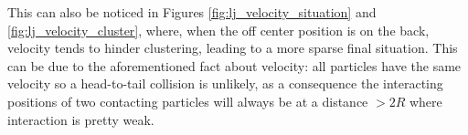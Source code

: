 \documentclass[../../master_thesis_np.tex]{subfiles}
\begin{document}
		This can also be noticed in Figures \ref{fig:lj_velocity_situation} and \ref{fig:lj_velocity_cluster}, where, when the off center position is on the back, velocity tends to hinder clustering, leading to a more sparse final situation. 
		This can be due to the aforementioned fact about velocity: all particles have the same velocity so a head-to-tail collision is unlikely, as a consequence the interacting positions of two contacting particles will always be at a distance $>2R$ where interaction is pretty weak. 
		
		
		\begin{figure}[htp]
			\centering
			\\
			\\

\end{figure}
\end{document}
